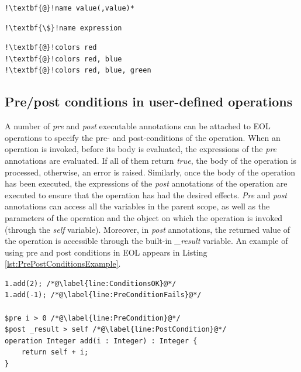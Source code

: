 \begin{lstlisting}[float=h, caption=Concrete syntax of simple annotations, label=lst:SimpleAnnotations, language=EOL, escapechar=!]
!\textbf{@}!name value(,value)*
\end{lstlisting}

\begin{lstlisting}[float=h, caption=Concrete syntax of executable annotations, label=lst:ExecutableAnnotations, language=EOL, escapechar=!]
!\textbf{\$}!name expression
\end{lstlisting}

\begin{lstlisting}[float=h, caption=Examples of simple annotations, label=lst:SimpleAnnotationsExamples, language=EOL, escapechar=!]
!\textbf{@}!colors red
!\textbf{@}!colors red, blue
!\textbf{@}!colors red, blue, green
\end{lstlisting}



\subsection{Pre/post conditions in user-defined operations}
\label{sec:prep-cond-user}

A number of \emph{pre} and \emph{post} executable annotations can be attached to EOL operations to specify the pre- and post-conditions of the operation. When an operation is invoked, before its body is evaluated, the expressions of the \emph{pre} annotations are evaluated. If all of them return \emph{true}, the body of the operation is processed, otherwise, an error is raised. Similarly, once the body of the operation has been executed, the expressions of the \emph{post} annotations of the operation are executed to ensure that the operation has had the desired effects. \emph{Pre} and \emph{post} annotations can access all the variables in the parent scope, as well as the parameters of the operation and the object on which the operation is invoked (through the \emph{self} variable). Moreover, in \emph{post} annotations, the returned value of the operation is accessible through the built-in \emph{\_result} variable. An example of using pre and post conditions in EOL appears in Listing \ref{lst:PrePostConditionsExample}.

\begin{lstlisting}[float=tbp, caption=Example of pre- and post-conditions in an EOL operation, label=lst:PrePostConditionsExample, language=EOL]
1.add(2); /*@\label{line:ConditionsOK}@*/
1.add(-1); /*@\label{line:PreConditionFails}@*/

$pre i > 0 /*@\label{line:PreCondition}@*/
$post _result > self /*@\label{line:PostCondition}@*/
operation Integer add(i : Integer) : Integer {
	return self + i;
}
\end{lstlisting}

